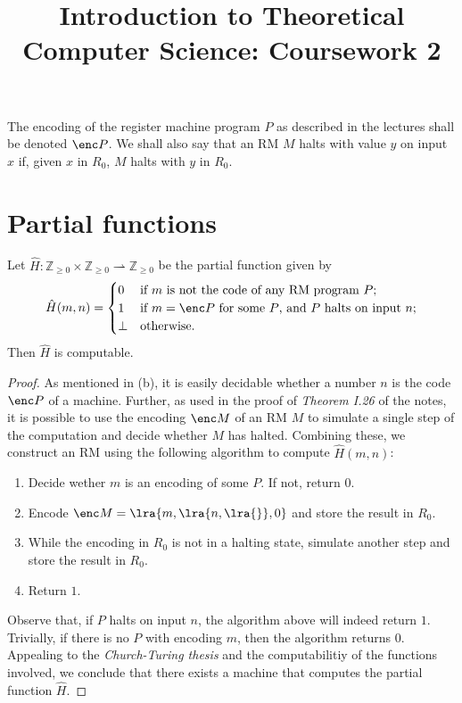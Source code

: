 \documentclass{article}
\title{Introduction to Theoretical Computer Science: Coursework 2}
\author{}
\begin{document}
\maketitle
\noindent The encoding of the register machine program $P$ as described in the lectures shall be denoted $\enc P$.
We shall also say that an RM $M$ halts with value $y$ on input $x$ if, given $x$ in $R_0$, $M$ halts 
with $y$ in $R_0$.
\renewcommand{\N}{\mathbb{Z}_{\geq 0}}
\section{Partial functions}
\begin{claim*}[a, 1]
    Let $\hat H:\N\times\N\rightharpoonup\N$ be the partial function given by 
    \begin{align*}
        \hat H(m,n)=\begin{cases}
            0 &\text{if $m$ is not the code of any RM program $P$;}\\
            1 &\text{if $m=\enc P$ for some $P$, and $P$ halts on input $n$;}\\
            \bot & \text{otherwise}.
        \end{cases}
    \end{align*}
    Then $\hat H$ is computable.
    \begin{proof}
        As mentioned in (b), it is easily decidable whether a number $n$ is the code $\enc P$ of a 
        machine. Further, as used in the proof of \emph{Theorem I.26} of the notes, it is possible 
        to use the encoding $\enc M$ of an RM $M$ to simulate a single step of the computation and decide whether 
        $M$ has halted. Combining these, we construct an RM using the following algorithm to compute 
        $\hat H(m,n)$:
        \begin{enumerate}
            \item Decide wether $m$ is an encoding of some $P$. If not, return $0$.
            \item Encode $\enc M=\lra{m, \lra{n, \lra{}}, 0}$ and store the result in $R_0$.
            \item While the encoding in $R_0$ is not in a halting state, simulate another step and store the result in $R_0$.
            \item Return $1$.
        \end{enumerate}
        Observe that, if $P$ halts on input $n$, the algorithm above will indeed return $1$. Trivially,
        if there is no $P$ with encoding $m$, then the algorithm returns $0$.
        Appealing to the \emph{Church-Turing thesis} and the computabilitiy of the functions involved, 
        we conclude that there exists a machine that computes the partial function $\hat H$.
    \end{proof}
\end{claim*}
\end{document}
